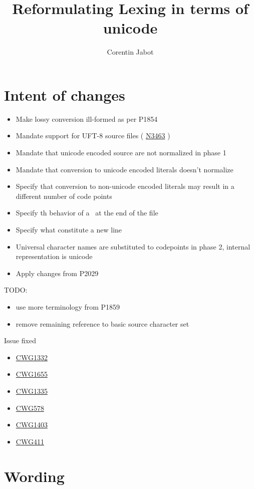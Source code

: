 \documentclass{wg21}
\title{Reformulating Lexing in terms of unicode}
\author{Corentin Jabot}{corentin.jabot@gmail.com}
\newcommand{\paper}[1]{ \href{https://wg21.link/#1}{#1} \cite{#1}}
\begin{document}
\maketitle

\paperquote{}


\section{Intent of changes}

\begin{itemize}
\item Make lossy conversion ill-formed as per P1854
\item Mandate support for UFT-8 source files (\paper{N3463})
\item Mandate that unicode encoded source are not normalized in phase 1
\item Mandate that conversion to unicode encoded literals doesn't normalize
\item Specify that conversion to non-unicode encoded literals may result in a different number of code points
\item Specify th behavior of a \ at the end of the file
\item Specify what constitute a new line
\item Universal character names are substituted to codepoints in phase 2, internal representation is unicode
\item Apply changes from P2029
\end{itemize}

TODO:

\begin{itemize}
\item use more terminology from P1859
\item remove remaining reference to basic source character set
\end{itemize}

Issue fixed
\begin{itemize}
    \item \paper{CWG1332}
    \item \paper{CWG1655}
    \item \paper{CWG1335}
    \item \paper{CWG578}
    \item \paper{CWG1403}
    \item \paper{CWG411}
\end{itemize}




\section{Wording}
\end{document}
